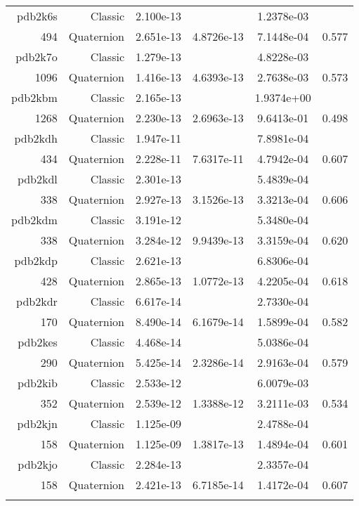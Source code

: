 \begin{xltabular}{\textwidth}{r|rS[table-format=1.3e+2]S[table-format=1.4e+2]S[table-format=1.4e+2]S[table-format=-1.3]}
pdb2k6s & Classic & 2.100e-13 &  & 1.2378e-03 & \\
494 & Quaternion & 2.651e-13 & 4.8726e-13 & 7.1448e-04 & 0.577\\  \addlinespace
{\color{red} pdb2k7o } & Classic & 1.279e-13 &  & 4.8228e-03 & \\
1096 & Quaternion & 1.416e-13 & 4.6393e-13 & 2.7638e-03 & 0.573\\  \addlinespace
{\color{red} pdb2kbm } & Classic & 2.165e-13 &  & 1.9374e+00 & \\
1268 & Quaternion & 2.230e-13 & 2.6963e-13 & 9.6413e-01 & 0.498\\  \addlinespace
pdb2kdh & Classic & 1.947e-11 &  & 7.8981e-04 & \\
434 & Quaternion & 2.228e-11 & 7.6317e-11 & 4.7942e-04 & 0.607\\  \addlinespace
pdb2kdl & Classic & 2.301e-13 &  & 5.4839e-04 & \\
338 & Quaternion & 2.927e-13 & 3.1526e-13 & 3.3213e-04 & 0.606\\  \addlinespace
pdb2kdm & Classic & 3.191e-12 &  & 5.3480e-04 & \\
338 & Quaternion & 3.284e-12 & 9.9439e-13 & 3.3159e-04 & 0.620\\  \addlinespace
pdb2kdp & Classic & 2.621e-13 &  & 6.8306e-04 & \\
428 & Quaternion & 2.865e-13 & 1.0772e-13 & 4.2205e-04 & 0.618\\  \addlinespace
pdb2kdr & Classic & 6.617e-14 &  & 2.7330e-04 & \\
170 & Quaternion & 8.490e-14 & 6.1679e-14 & 1.5899e-04 & 0.582\\  \addlinespace
pdb2kes & Classic & 4.468e-14 &  & 5.0386e-04 & \\
290 & Quaternion & 5.425e-14 & 2.3286e-14 & 2.9163e-04 & 0.579\\  \addlinespace
{\color{red} pdb2kib } & Classic & 2.533e-12 &  & 6.0079e-03 & \\
352 & Quaternion & 2.539e-12 & 1.3388e-12 & 3.2111e-03 & 0.534\\  \addlinespace
pdb2kjn & Classic & 1.125e-09 &  & 2.4788e-04 & \\
158 & Quaternion & 1.125e-09 & 1.3817e-13 & 1.4894e-04 & 0.601\\  \addlinespace
pdb2kjo & Classic & 2.284e-13 &  & 2.3357e-04 & \\
158 & Quaternion & 2.421e-13 & 6.7185e-14 & 1.4172e-04 & 0.607\\  \addlinespace

\end{xltabular}
